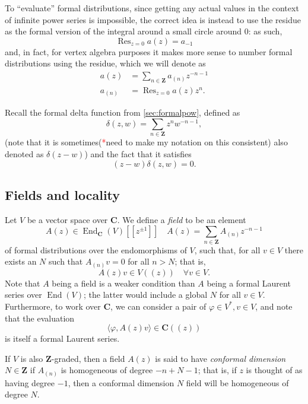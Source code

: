 \documentclass{article}
\newcommand{\CC}{\mathbold{C}}
\newcommand{\ZZ}{\mathbold{Z}}
\newcommand{\tk}{\textcolor{red}{*}}
\DeclareMathOperator{\Res}{Res}
\DeclareMathOperator{\End}{End}
\begin{document}
To ``evaluate'' formal distributions, since getting any actual values in the context of infinite power series is impossible, the correct idea is instead to use the residue as the formal version of the integral around a small circle around $0$: as such, 
\[\Res_{z=0}a(z)=a_{-1} \]
and, in fact, for vertex algebra purposes it makes more sense to number formal distributions using the residue, which we will denote as
\begin{align*}
  a(z)&=\sum_{n \in \ZZ}a_{(n)}z^{-n-1}\\
  a_{(n)}&=\Res_{z=0}a(z)z^n.
\end{align*}

Recall the formal delta function from \ref{sec:formalpow}, defined as
\[\delta(z,w)=\sum_{n \in \ZZ}z^nw^{-n-1}, \]
(note that it is sometimes(\tk need to make my notation on this consistent) also denoted as $\delta(z-w)$) and the fact that it satisfies
\[(z-w)\delta(z,w)=0. \]
\subsection{Fields and locality}
Let $V$ be a vector space over $\CC$.  We define a \textit{field} to be an element
\[A(z) \in \End_\CC(V)[[z^{\pm 1}]] \quad A(z)=\sum_{n \in \ZZ} A_{(n)}z^{-n-1} \]
of formal distributions over the endomorphisms of $V$, such that, for all $v \in V$ there exists an $N$ such that $A_{(n)}v=0$ for all $n>N$; that is, 
\[A(z)v \in V((z)) \quad \forall v \in V. \]
Note that $A$ being a field is a weaker condition than $A$ being a formal Laurent series over $\End(V)$; the latter would include a global $N$ for all $v \in V$.  Furthermore, to work over $\CC$, we can consider a pair of $\varphi \in V^*, v \in V$, and note that the evaluation
\[\langle \varphi, A(z)v \rangle \in \CC((z)) \]
is itself a formal Laurent series.

If $V$ is also $\ZZ$-graded, then a field $A(z)$ is said to have \textit{conformal dimension} $N \in \ZZ$ if $A_{(n)}$ is homogeneous of degree $-n+N-1$; that is, if $z$ is thought of as having degree $-1$, then a conformal dimension $N$ field will be homogeneous of degree $N$.
\end{document}
